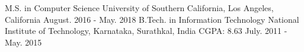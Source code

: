 \begin{cventries}
  \cventry
    {M.S. in Computer Science}
    {University of Southern California, Los Angeles, California}
    {}
    {August. 2016 - May. 2018}
    {}
    \cventry
    {B.Tech. in Information Technology}
    {National Institute of Technology, Karnataka, Surathkal, India}
    {CGPA: 8.63}
    {July. 2011 - May. 2015}
    {}
\end{cventries}
